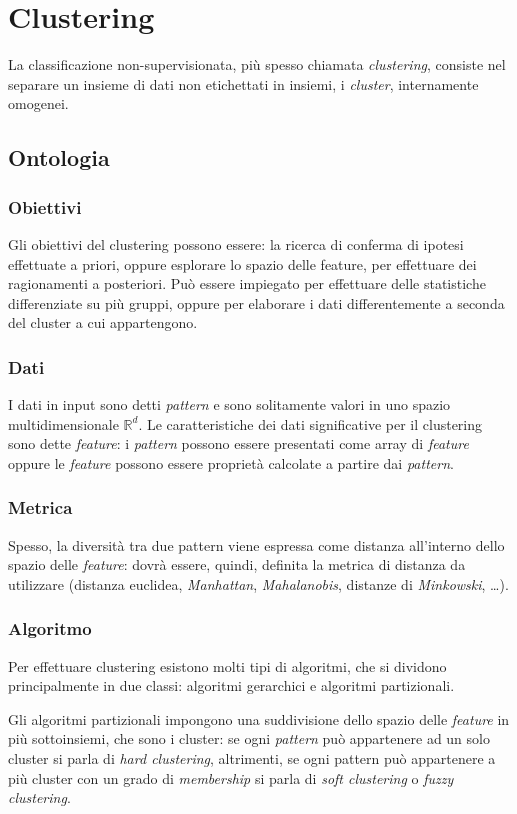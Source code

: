 \documentclass[12pt]{report}
\begin{document}
\section{Clustering}
La classificazione non-supervisionata, più spesso chiamata \textit{clustering}, consiste nel separare un insieme di dati non etichettati in insiemi, i \textit{cluster}, internamente omogenei.
\subsection{Ontologia}
\subsubsection{Obiettivi}
Gli obiettivi del clustering possono essere: la ricerca di conferma di ipotesi effettuate a priori, oppure esplorare lo spazio delle feature, per effettuare dei ragionamenti a posteriori. Può essere impiegato per effettuare delle statistiche differenziate su più gruppi, oppure per elaborare i dati differentemente a seconda del cluster a cui appartengono.
\subsubsection{Dati}
I dati in input sono detti \textit{pattern} e sono solitamente valori in uno spazio multidimensionale $\mathbb{R}^d$. Le caratteristiche dei dati significative per il clustering sono dette \textit{feature}: i \textit{pattern} possono essere presentati come array di \textit{feature} oppure le \textit{feature} possono essere proprietà calcolate a partire dai \textit{pattern}.
\subsubsection{Metrica}
Spesso, la diversità tra due pattern viene espressa come distanza all'interno dello spazio delle \textit{feature}: dovrà essere, quindi, definita la metrica di distanza da utilizzare (distanza euclidea, \textit{Manhattan}, \textit{Mahalanobis}, distanze di \textit{Minkowski}, \dots ).

\subsubsection{Algoritmo}
Per effettuare clustering esistono molti tipi di algoritmi, che si dividono principalmente in due classi: algoritmi gerarchici e algoritmi partizionali.

Gli algoritmi partizionali impongono una suddivisione dello spazio delle \textit{feature} in più sottoinsiemi, che sono i cluster: se ogni \textit{pattern} può appartenere ad un solo cluster si parla di \textit{hard clustering}, altrimenti, se ogni pattern può appartenere a più cluster con un grado di \textit{membership} si parla di \textit{soft clustering} o \textit{fuzzy clustering}.
\end{document}
